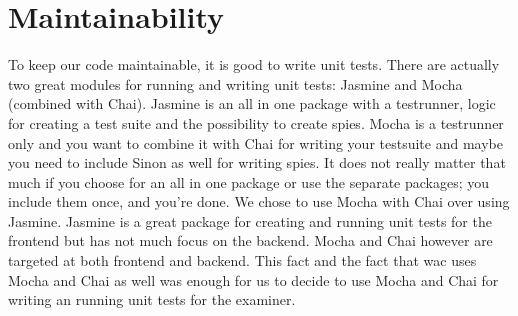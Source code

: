 \section{Maintainability}
To keep our code maintainable, it is good to write unit tests.
There are actually two great modules for running and writing unit tests:
Jasmine and Mocha (combined with Chai).
Jasmine is an all in one package with a testrunner,
logic for creating a test suite and the possibility to create spies.
Mocha is a testrunner only
and you want to combine it with Chai for writing your testsuite
and maybe you need to include Sinon as well for writing spies.
It does not really matter that much if you choose for an all in one package
or use the separate packages; you include them once, and you're done.
We chose to use Mocha with Chai over using Jasmine.
Jasmine is a great package for creating and running unit tests for the frontend
but has not much focus on the backend.
Mocha and Chai however are targeted at both frontend and backend.
This fact and the fact that \gls{wac} uses Mocha and Chai as well
was enough for us to decide to use Mocha and Chai
for writing an running unit tests for the \gls{examiner}.
